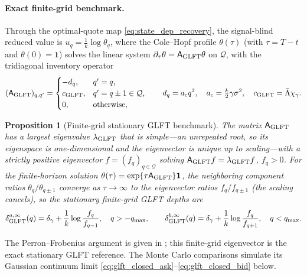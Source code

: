\documentclass[11pt,a4paper]{article}
\newcommand{\Qcal}{\mathcal{Q}}
\theoremstyle{plain}
\newtheorem{proposition}{Proposition}[section]
\theoremstyle{definition}
\begin{document}
\paragraph{Exact finite-grid benchmark.}
Through the optimal-quote map \eqref{eq:state_dep_recovery}, the signal-blind
reduced value is \(u_q=\tfrac1k\log\theta_q\), where the Cole--Hopf profile
\(\theta(\tau)\) (with \(\tau=T-t\) and \(\theta(0)=\mathbf 1\)) solves the
linear system \(\partial_\tau\theta=\mathsf A_{\rm GLFT}\theta\)
on \(\Qcal\), with the tridiagonal inventory operator
\[
(\mathsf A_{\rm GLFT})_{q,q'}=
\begin{cases}
-d_q, & q'=q,\\
c_{\rm GLFT}, & q'=q\pm1\in\Qcal,\\
0, & \text{otherwise},
\end{cases}
\qquad
d_q=a_{\rm c}q^2,
\quad
a_{\rm c}=\tfrac{k}{2}\gamma\sigma^2,
\quad
c_{\rm GLFT}=\bar\Lambda\chi_\gamma .
\]
\begin{proposition}[Finite-grid stationary GLFT benchmark]
\label{prop:glft_stationary}
The matrix \(\mathsf A_{\rm GLFT}\) has a largest eigenvalue
\(\lambda_{\rm GLFT}\) that is \emph{simple}---an unrepeated root, so its
eigenspace is one-dimensional and the eigenvector is unique up to
scaling---with a strictly positive eigenvector
\(f=(f_q)_{q\in\Qcal}\) solving \(\mathsf A_{\rm GLFT}f=\lambda_{\rm GLFT}f\),
\(f_q>0\).  For the finite-horizon solution
\(\theta(\tau)=\exp\{\tau\mathsf A_{\rm GLFT}\}\mathbf 1\), the neighboring
component ratios \(\theta_q/\theta_{q\pm1}\) converge as \(\tau\to\infty\) to
the eigenvector ratios \(f_q/f_{q\pm1}\) (the scaling cancels), so the
stationary finite-grid GLFT depths are
\begin{equation}
\delta_{\rm GLFT}^{a,\infty}(q)
=\delta_\gamma+\frac1k\log\frac{f_q}{f_{q-1}},
\quad q>-q_{\max},\qquad
\delta_{\rm GLFT}^{b,\infty}(q)
=\delta_\gamma+\frac1k\log\frac{f_q}{f_{q+1}},
\quad q<q_{\max}.
\label{eq:glft_stationary_depths}
\end{equation}
\end{proposition}
The Perron--Frobenius argument is given in \cite{GLFT2013}; this finite-grid
eigenvector is the exact stationary GLFT reference.  The Monte Carlo comparisons
simulate its Gaussian continuum limit
\eqref{eq:glft_closed_ask}--\eqref{eq:glft_closed_bid} below.
\end{document}
